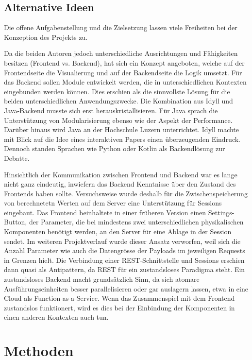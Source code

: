 \documentclass[a4paper,10.2pt,pdftex]{scrartcl}%
\begin{document}
\subsection{Alternative Ideen}
Die offene Aufgabenstellung und die Zielsetzung lassen viele Freiheiten bei der Konzeption des Projekts zu.

Da die beiden Autoren jedoch unterschiedliche Ausrichtungen und Fähigkeiten besitzen (Frontend vs. Backend), hat sich ein Konzept angeboten, welche auf der Frontendseite die Visualierung und auf der Backendseite die Logik umsetzt. Für das Backend sollen Module entwickelt werden, die in unterschiedlichen Kontexten eingebunden werden können. Dies erschien als die sinnvollste Lösung für die beiden unterschiedlichen Anwendungszwecke. Die Kombination aus Idyll und Java-Backend musste sich erst herauskristallisieren. Für Java sprach die Unterstützung von Modularisierung ebenso wie der Aspekt der Performance. Darüber hinaus wird Java an der Hochschule Luzern unterrichtet. Idyll machte mit Blick auf die Idee eines interaktiven Papers einen überzeugenden Eindruck. Dennoch standen Sprachen wie Python oder Kotlin als Backendlösung zur Debatte. 

Hinsichtlich der Kommunikation zwischen Frontend und Backend war es lange nicht ganz eindeutig, inwiefern das Backend Kenntnisse über den Zustand des Frontends haben sollte. Versuchsweise wurde deshalb für die Zwischenspeicherung von berechnetetn Werten auf dem Server eine Unterstützung für Sessions eingebaut. Das Frontend beinhaltete in einer früheren Version einen Settings-Button, der Parameter, die bei mindestens zwei unterschiedlichen physikalischen Komponenten benötigt werden, an den Server für eine Ablage in der Session sendet. Im weiteren Projektverlauf wurde dieser Ansatz verworfen, weil sich die Anzahl Parameter wie auch die Datengrösse der Payloads im jeweiligen Requests in Grenzen hielt. Die Verbindung einer REST-Schnittstelle und Sessions erschien dann quasi als Antipattern, da REST für ein zustandsloses Paradigma steht. Ein zustandsloses Backend macht grundsätzlich Sinn, da sich atomare Ausführungseinheiten besser parallelisieren oder gar auslagern lassen, etwa in eine Cloud als Function-as-a-Service. Wenn das Zusammenspiel mit dem Frontend zustandslos funktionert, wird es dies bei der Einbindung der Komponenten in einen anderen Kontexten auch tun. 

\section{Methoden}
\end{document}
